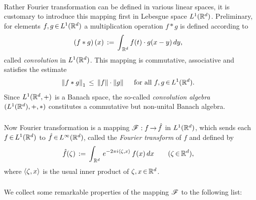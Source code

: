 \documentclass[11pt,twoside]{article}
\begin{document}
\paragraph*{}
Rather Fourier transformation can be defined in various linear spaces,
it is customary to introduce this mapping first in Lebesgue space $L^1({\mathbb{R}}^d)$.
Preliminary,
for elements $f,g {\,\in\,} L^1({\mathbb{R}}^d)$ 
a multiplication operation $f \ast g$ is defined according to
\[
(f \ast g) \, (x) \,:=\, \int_{\,{\mathbb{R}}^d} f(t) \cdot g(x-y) \, dy,
\]
called \textit{convolution} in $L^1({\mathbb{R}}^d)$.
This mapping is commutative, associative and satisfies the estimate
\[
\left\lVert f \ast g \right\rVert_1 \, \leq \, \left\lVert f \right\rVert \cdot \left\lVert g \right\rVert
\quad \mbox{ for all } f,g {\,\in\,} L^1({\mathbb{R}}^d).
\]
Since $L^1({\mathbb{R}}^d,+)$ is a Banach space,
the so-called \textit{convolution algebra} $(L^1({\mathbb{R}}^d),+,\ast)$
constitutes a commutative but non-unital Banach algebra.

\subparagraph*{}
Now {Fourier transformation} is a mapping $\mathscr{F}:f {\,\to\,} \hat{f}$ in $L^1({\mathbb{R}}^d)$,
which sends each $f {\,\in\,} L^1({\mathbb{R}}^d)$ to $\hat{f} {\,\in\,} L^{\infty}({\mathbb{R}}^d)$,
called the \textit{Fourier transform} of $f$ and defined by
\begin{equation}\label{L1_FOURIER_TRANSFORM}
\hat{f}(\zeta) \,:=\,
\int_{\,{\mathbb{R}}^d} \, e^{-2 \pi i \langle \zeta,x \rangle} \, f(x) \, dx
\quad \quad (\zeta {\,\in\,} {\mathbb{R}}^d),
\end{equation}
where $\langle \zeta,x \rangle$ is the usual inner product of $\zeta,x {\,\in\,} {\mathbb{R}}^d$.

\subsubsection*{} %
We collect some remarkable properties of the mapping $\mathscr{F}$
to the following list:
\end{document}
